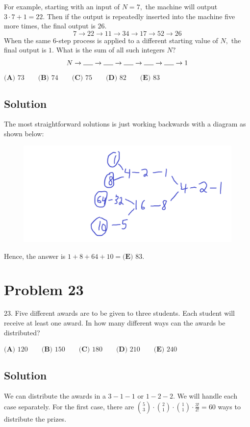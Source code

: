 \documentclass{article}
\begin{document}
For example, starting with an input of $N=7,$ the machine will output $3 \cdot 7 +1 = 22.$ Then if the output is repeatedly inserted into the machine five more times, the final output is $26.$
$$7 \to 22 \to 11 \to 34 \to 17 \to 52 \to 26$$When the same $6$-step process is applied to a different starting value of $N,$ the final output is $1.$ What is the sum of all such integers $N?$
$$N \to \rule{0.5cm}{0.15mm} \to \rule{0.5cm}{0.15mm} \to \rule{0.5cm}{0.15mm} \to \rule{0.5cm}{0.15mm} \to \rule{0.5cm}{0.15mm} \to 1$$
$\textbf{(A) }73 \qquad \textbf{(B) }74 \qquad \textbf{(C) }75 \qquad \textbf{(D) }82 \qquad \textbf{(E) }83$
\subsection{Solution}
The most straightforward solutions is just working backwards with a diagram as shown below:

\begin{figure}[ht]
\centering
\includegraphics[width=.5\textwidth]{2020 AMC 8 Solution 22.png}

\end{figure}

Hence, the answer is $1+8+64+10=\textbf{(E) }83$.


\section{Problem 23}
$23.$ Five different awards are to be given to three students. Each student will receive at least one
award. In how many different ways can the awards be distributed?

$\textbf{(A) }120 \qquad \textbf{(B) }150 \qquad \textbf{(C) }180 \qquad \textbf{(D) }210 \qquad \textbf{(E) }240$
\subsection{Solution}
We can distribute the awards in a $3-1-1$ or $1-2-2$. We will handle each case separately.
For the first case, there are $\binom53 \cdot \binom21 \cdot \binom11 \cdot \frac{3!}{2!} = 60$ ways to distribute the prizes.
\end{document}

